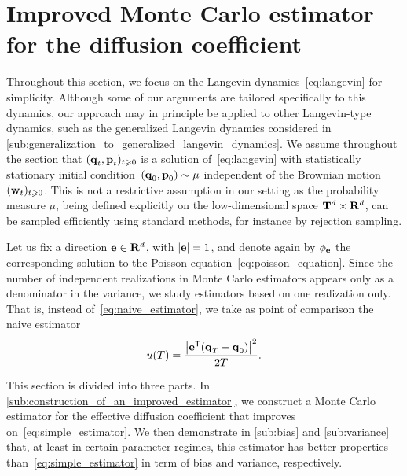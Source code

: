 \documentclass[11pt,a4paper]{article}
\begin{document}
\section{Improved Monte Carlo estimator for the diffusion coefficient}%
\label{sec:method}%

Throughout this section,
we focus on the Langevin dynamics~\eqref{eq:langevin} for simplicity.
Although some of our arguments are tailored specifically to this dynamics,
our approach may in principle be applied to other Langevin-type dynamics,
such as the generalized Langevin dynamics considered in \cref{sub:generalization_to_generalized_langevin_dynamics}.
We assume throughout the section that $(\boldsymbol{\mathbf q}_t, \boldsymbol{\mathbf p}_t)_{t\geqslant 0}$ is a solution of~\eqref{eq:langevin} with statistically stationary initial condition~$(\boldsymbol{\mathbf q}_0, \boldsymbol{\mathbf p}_0) \sim \mu$ independent of the Brownian motion $(\boldsymbol{\mathbf w}_t)_{t \geqslant 0}$.
This is not a restrictive assumption in our setting as the probability measure $\mu$,
being defined explicitly on the low-dimensional space $\mathbf T^d \times \mathbf R^d$,
can be sampled efficiently using standard methods,
for instance by rejection sampling.

Let us fix a direction $\boldsymbol{\mathbf e} \in \mathbf R^d$, with $|\boldsymbol{\mathbf e}| = 1$,
and denote again by $\phi_{\boldsymbol{\mathbf e}}$ the corresponding solution to the Poisson equation~\eqref{eq:poisson_equation}.
Since the number of independent realizations in Monte Carlo estimators
appears only as a denominator in the variance,
we study estimators based on one realization only.
That is, instead of~\eqref{eq:naive_estimator}, we take as point of comparison the naive estimator
\begin{equation}
    \label{eq:simple_estimator}
    u(T) = \frac{\abs{\vect e^\t (\vect q_T - \vect q_0)}^2}{2T}.
\end{equation}

This section is divided into three parts.
In \cref{sub:construction_of_an_improved_estimator},
we construct a Monte Carlo estimator for the effective diffusion coefficient that improves on~\eqref{eq:simple_estimator}.
We then demonstrate in \cref{sub:bias} and \cref{sub:variance} that,
at least in certain parameter regimes,
this estimator has better properties than~\eqref{eq:simple_estimator} in term of bias and variance, respectively.
\end{document}
